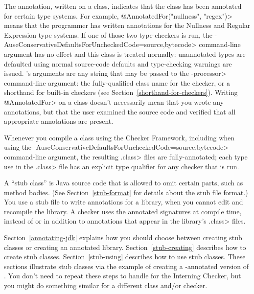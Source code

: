The  annotation, written on a
class, indicates that the class has been annotated for certain type
systems.  For example, \<@AnnotatedFor(\ttlcb"nullness", "regex"\ttrcb)> means that
the programmer has written annotations for the Nullness and Regular
Expression type systems.  If one of those two type-checkers is run,
the \<-AuseConservativeDefaultsForUncheckedCode=source,bytecode> command-line argument
has no effect and this class is treated normally:
unannotated types are defaulted using normal source-code
defaults and type-checking warnings are issued.
's arguments are any string that
may be passed to the \<-processor> command-line argument:  the
fully-qualified class name for the checker, or a shorthand for built-in
checkers (see Section~\ref{shorthand-for-checkers}).
Writing \<@AnnotatedFor> on a class doesn't necessarily mean that you wrote
any annotations, but that the user examined the source code and verified
that all appropriate annotations are present.

\begin{sloppypar}
Whenever you compile a class using the Checker Framework, including when
using the \<-AuseConservativeDefaultsForUncheckedCode=source,bytecode> command-line
argument, the resulting \<.class> files are fully-annotated; each type use
in the \<.class> file has an explicit type qualifier for any checker that
is run.
\end{sloppypar}



A ``stub class'' is Java source code that is allowed to omit certain parts,
such as method bodies.  (See Section~\ref{stub-format} for details
about the stub file format.)  You use a stub file to write annotations
for a library, when you cannot edit and recompile the library.  A
checker uses the annotated signatures at compile time, instead of or in
addition to annotations that appear in the library's \<.class> files.

Section~\ref{annotating-jdk} explains how you should choose between
creating stub classes or creating an annotated library.
Section~\ref{stub-creating} describes how to create stub classes.
Section~\ref{stub-using} describes how to use stub classes.
These sections illustrate stub classes via the example of creating a -annotated
version of .  You don't need to repeat these steps
to handle  for the Interning Checker,
but you might do something similar for a different class and/or checker.


